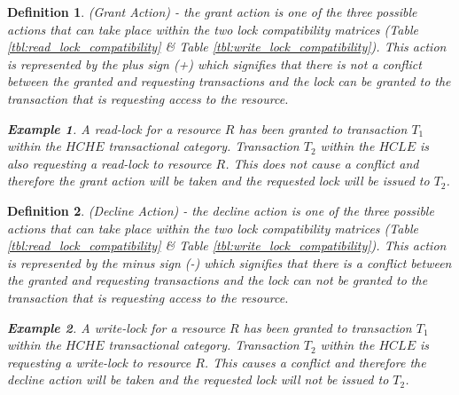 \documentclass[conference]{IEEEtran}
\newtheorem{definition}{Definition}
\newtheorem{example}{Example}[definition]
\begin{document}

\begin{definition}
\label{grant_action}
 (Grant Action) - the grant action is one of the three possible actions that can take place within the two lock compatibility matrices (Table \ref{tbl:read_lock_compatibility} \& Table \ref{tbl:write_lock_compatibility}). This action is represented by the plus sign (+) which signifies that there is not a conflict between the granted and requesting transactions and the lock can be granted to the transaction that is requesting access to the resource.
 
 \begin{example}
 \label{ex_grant_action}
  A read-lock for a resource $R$ has been granted to transaction $T_{1}$ within the $HCHE$ transactional category. Transaction $T_{2}$ within the $HCLE$ is also requesting a read-lock to resource $R$. This does not cause a conflict and therefore the grant action will be taken and the requested lock will be issued to $T_{2}$.
 \end{example}
 
\end{definition}

\begin{definition}
\label{decline_action}
 (Decline Action) - the decline action is one of the three possible actions that can take place within the two lock compatibility matrices (Table \ref{tbl:read_lock_compatibility} \& Table \ref{tbl:write_lock_compatibility}). This action is represented by the minus sign (-) which signifies that there is a conflict between the granted and requesting transactions and the lock can not be granted to the transaction that is requesting access to the resource.
 
 \begin{example}
 \label{ex_decline_action}
  A write-lock for a resource $R$ has been granted to transaction $T_{1}$ within the $HCHE$ transactional category. Transaction $T_{2}$ within the $HCLE$ is requesting a write-lock to resource $R$. This causes a conflict and therefore the decline action will be taken and the requested lock will not be issued to $T_{2}$.
 \end{example}
 
\end{definition}
\end{document}

